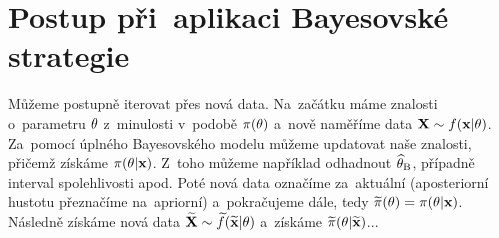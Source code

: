 \section*{Postup při~aplikaci Bayesovské strategie} 
Můžeme postupně iterovat přes nová data. Na~začátku máme znalosti o~parametru $\theta$ z~minulosti v~podobě $\pi(\theta)$ a~nově naměříme data $\textbf{X}\sim f(\textbf{x}|\theta)$. Za~pomocí úplného Bayesovského modelu můžeme updatovat naše znalosti, přičemž získáme $\pi(\theta|\textbf{x})$. Z~toho můžeme například odhadnout $\widehat{\theta}_\mathrm{B}$, případně interval spolehlivosti apod. Poté nová data označíme za~aktuální (aposteriorní hustotu přeznačíme na~apriorní) a~pokračujeme dále, tedy $\widetilde{\pi}(\theta)=\pi(\theta|\textbf{x})$. Následně získáme nová data $\widetilde{\textbf{X}}\sim\widetilde{f}(\widetilde{\textbf{x}}|\theta)$ a~získáme $\widetilde{\pi}(\theta|\widetilde{\textbf{x}})$... 

